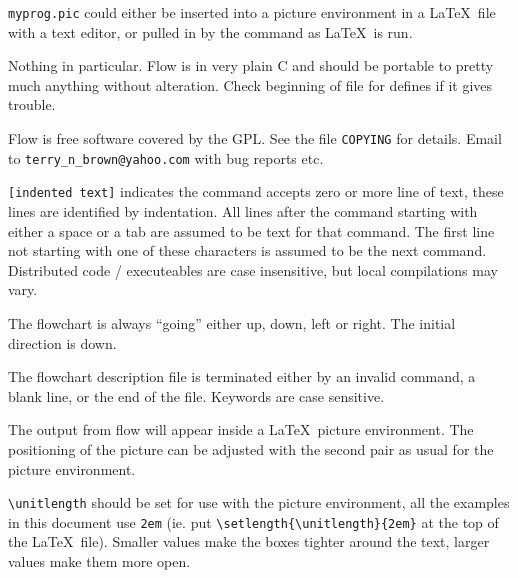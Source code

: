 \verb+myprog.pic+ could either be inserted into a picture environment in a
\LaTeX\ file with a text editor, or pulled in by the \verb++ command as
\LaTeX\ is run.


Nothing in particular.  Flow is in very plain C and should be portable to
pretty much anything without alteration.  Check beginning of file for defines
if it gives trouble.


Flow is free software covered by the GPL.  See the file \verb+COPYING+
for details.  Email to \verb+terry_n_brown@yahoo.com+ with bug reports
etc.

\newpage
{}

\verb+[indented text]+ indicates the command accepts zero or more line of
text, these lines are identified by indentation.  All lines after the command
starting with either a space or a tab are assumed to be text for that
command.  The first line not starting with one of these characters is assumed
to be the next command.  Distributed code / executeables are case
insensitive, but local compilations may vary.

The flowchart is always ``going'' either up, down, left or right.  The
initial direction is down.

The flowchart description file is terminated either by an invalid command,
a blank line, or the end of the file.  Keywords are case sensitive.

%

The output from flow will appear inside a \LaTeX\ picture environment.
The positioning of the picture can be adjusted with the second pair as usual
for the picture environment.

\verb+\unitlength+ should be set for use with the picture environment, all
the examples in this document use \verb+2em+ (ie. put
\verb+\setlength{\unitlength}{2em}+ at the top of the \LaTeX\ file).
Smaller values make the boxes tighter around the text, larger values make
them more open.

